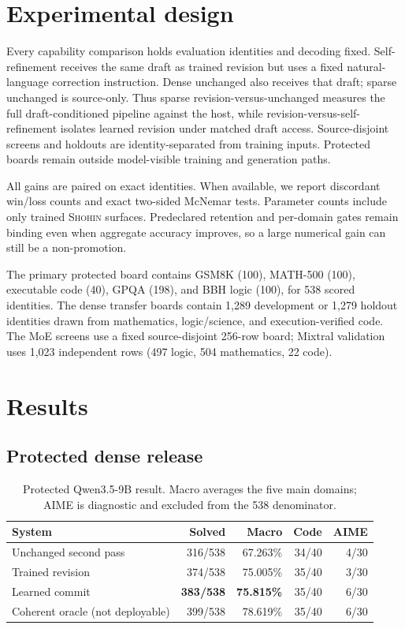 \documentclass[10pt]{article}
\newcommand{\shohin}{\textsc{Shohin}}
\newcommand{\best}[1]{\textbf{#1}}
\begin{document}
\section{Experimental design}

Every capability comparison holds evaluation identities and decoding fixed.
Self-refinement receives the same draft as trained revision but uses a fixed
natural-language correction instruction. Dense unchanged also receives that
draft; sparse unchanged is source-only. Thus sparse revision-versus-unchanged
measures the full draft-conditioned pipeline against the host, while
revision-versus-self-refinement isolates learned revision under matched draft
access. Source-disjoint screens and holdouts are identity-separated from
training inputs. Protected boards remain outside model-visible training and
generation paths.

All gains are paired on exact identities. When available, we report discordant
win/loss counts and exact two-sided McNemar tests. Parameter counts include only
trained \shohin{} surfaces. Predeclared retention and per-domain gates remain
binding even when aggregate accuracy improves, so a large numerical gain can
still be a non-promotion.

The primary protected board contains GSM8K (100), MATH-500 (100), executable
code (40), GPQA (198), and BBH logic (100), for 538 scored identities. The dense
transfer boards contain 1,289 development or 1,279 holdout identities drawn
from mathematics, logic/science, and execution-verified code. The MoE screens
use a fixed source-disjoint 256-row board; Mixtral validation uses 1,023
independent rows (497 logic, 504 mathematics, 22 code).

\section{Results}

\subsection{Protected dense release}

\begin{table}[h]
\centering
\small
\caption{Protected Qwen3.5-9B result. Macro averages the five main domains;
AIME is diagnostic and excluded from the 538 denominator.}
\begin{tabular}{lrrrr}
\toprule
System & Solved & Macro & Code & AIME\\
\midrule
Unchanged second pass & 316/538 & 67.263\% & 34/40 & 4/30\\
Trained revision & 374/538 & 75.005\% & 35/40 & 3/30\\
Learned commit & \best{383/538} & \best{75.815\%} & 35/40 & 6/30\\
Coherent oracle (not deployable) & 399/538 & 78.619\% & 35/40 & 6/30\\
\bottomrule
\end{tabular}
\label{tab:protected}
\end{table}
\end{document}
